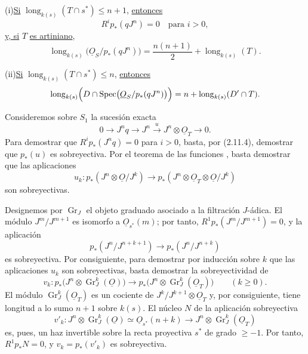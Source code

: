 \medskip
\noindent (i)\quad \underline{Si}
$\operatorname{long}_{k(s)}(T\cap s^*)\leq n+1$, \underline{entonces}
\begin{equation*}
R^ip_*(qJ^n)=0\quad\text{para }i>0,
\end{equation*}
\underline{y, si} $T$ \underline{es artiniano},
\begin{equation*}
\operatorname{long}_{k(s)}
\bigl(\underline{O}_S/p_*(qJ^n)\bigr)
=\frac{n(n+1)}2+\operatorname{long}_{k(s)}(T).
\end{equation*}

\pageoriginale

\noindent (ii)\quad \underline{Si}
$\operatorname{long}_{k(s)}(T\cap s^*)\leq n$, \underline{entonces}
\begin{equation*}
\operatorname{long}_{k(s)}
\Bigl(D\cap
\operatorname{Spec}\bigl(\underline{O}_S/p_*(qJ^n)\bigr)\Bigr)
=n+\operatorname{long}_{k(s)}(D'\cap T).
\end{equation*}

Consideremos sobre $S_1$ la sucesión exacta
\begin{equation}\tag{2.14.1}
0\longrightarrow J^nq
\longrightarrow J^n
\xrightarrow{\,u\,}J^n\otimes\underline{O}_T
\longrightarrow0.
\end{equation}
Para demostrar que $R^ip_*(J^nq)=0$ para $i>0$, basta, por (2.11.4), demostrar
que $p_*(u)$ es sobreyectiva. Por el teorema de las funciones
, basta demostrar que las aplicaciones
\begin{equation*}
u_k:p_*(J^n\otimes\underline{O}/J^k)
\longrightarrow
p_*(J^n\otimes\underline{O}_T\otimes\underline{O}/J^k)
\end{equation*}
son sobreyectivas.

Designemos por $\operatorname{Gr}_J$ el objeto graduado asociado a la filtración
$J$-ádica. El módulo $J^m/J^{m+1}$ es isomorfo a
$\underline{O}_{s^*}(m)$; por tanto, $R^1p_*(J^m/J^{m+1})=0$, y la aplicación
\begin{equation*}
p_*(J^n/J^{n+k+1})\longrightarrow p_*(J^n/J^{n+k})
\end{equation*}
es sobreyectiva. Por consiguiente, para demostrar por inducción sobre $k$ que
las aplicaciones $u_k$ son sobreyectivas, basta demostrar la sobreyectividad de
\begin{equation*}
v_k:p_*\bigl(J^n\otimes\operatorname{Gr}_J^k(\underline{O})\bigr)
\longrightarrow
p_*\bigl(J^n\otimes\operatorname{Gr}_J^k(\underline{O}_T)\bigr)
\qquad(k\geq0).
\end{equation*}
El módulo $\operatorname{Gr}_J^k(\underline{O}_T)$ es un cociente de
$J^k/J^{k+1}\otimes\underline{O}_T$ y, por consiguiente, tiene longitud a lo
sumo $n+1$ sobre $k(s)$. El núcleo $N$ de la aplicación sobreyectiva
\begin{equation*}
v'_k:J^n\otimes\operatorname{Gr}_J^k(\underline{O})
\simeq\underline{O}_{s^*}(n+k)
\longrightarrow
J^n\otimes\operatorname{Gr}_J^k(\underline{O}_T)
\end{equation*}
es, pues, un haz invertible sobre la recta proyectiva $s^*$ de grado $\geq-1$.
Por tanto, $R^1p_*N=0$, y $v_k=p_*(v'_k)$ es sobreyectiva.

